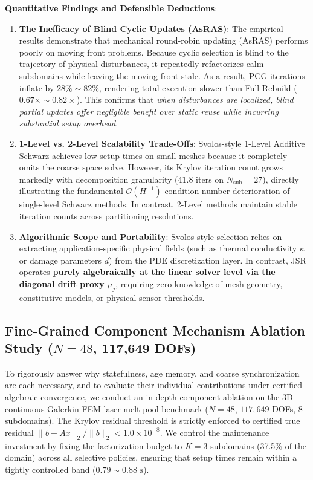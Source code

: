 \documentclass[preprint,12pt,3p]{elsarticle}
\begin{document}
\textbf{Quantitative Findings and Defensible Deductions}:
\begin{enumerate}
    \item \textbf{The Inefficacy of Blind Cyclic Updates (AsRAS)}: The empirical results demonstrate that mechanical round-robin updating (AsRAS) performs poorly on moving front problems. Because cyclic selection is blind to the trajectory of physical disturbances, it repeatedly refactorizes calm subdomains while leaving the moving front stale. As a result, PCG iterations inflate by $28\% \sim 82\%$, rendering total execution slower than Full Rebuild ($0.67\times \sim 0.82\times$). This confirms that \textit{when disturbances are localized, blind partial updates offer negligible benefit over static reuse while incurring substantial setup overhead}.
    \item \textbf{1-Level vs. 2-Level Scalability Trade-Offs}: Svolos-style 1-Level Additive Schwarz achieves low setup times on small meshes because it completely omits the coarse space solve. However, its Krylov iteration count grows markedly with decomposition granularity ($41.8$ iters on $N_{\text{sub}}=27$), directly illustrating the fundamental $\mathcal{O}(H^{-1})$ condition number deterioration of single-level Schwarz methods. In contrast, 2-Level methods maintain stable iteration counts across partitioning resolutions.
    \item \textbf{Algorithmic Scope and Portability}: Svolos-style selection relies on extracting application-specific physical fields (such as thermal conductivity $\kappa$ or damage parameters $d$) from the PDE discretization layer. In contrast, JSR operates \textbf{purely algebraically at the linear solver level via the diagonal drift proxy $\mu_j$}, requiring zero knowledge of mesh geometry, constitutive models, or physical sensor thresholds.
\end{enumerate}

\subsection{Fine-Grained Component Mechanism Ablation Study ($N=48$, 117,649 DOFs)}
\label{subsec:same_budget_ablation}

To rigorously answer why statefulness, age memory, and coarse synchronization are each necessary, and to evaluate their individual contributions under certified algebraic convergence, we conduct an in-depth component ablation on the 3D continuous Galerkin FEM laser melt pool benchmark ($N=48$, $117,649$ DOFs, 8 subdomains). The Krylov residual threshold is strictly enforced to certified true residual $\|b - A x\|_2 / \|b\|_2 < 1.0 \times 10^{-8}$. We control the maintenance investment by fixing the factorization budget to $K = 3$ subdomains (37.5\% of the domain) across all selective policies, ensuring that setup times remain within a tightly controlled band ($0.79 \sim 0.88\text{ s}$).
\end{document}

